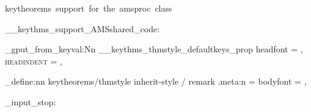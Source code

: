   {keytheorems~support~for~the~amsproc~class}

\__keythms_support_AMSshared_code:

\prop_gput_from_keyval:Nn \g__keythms_thmstyle_defaultkeys_prop
  {
    headfont   = \scshape,
    headindent = \parindent,
  }

\keys_define:nn { keytheorems/thmstyle }
  {
    inherit-style / remark .meta:n = { bodyfont = \normalfont },
  }

\file_input_stop: